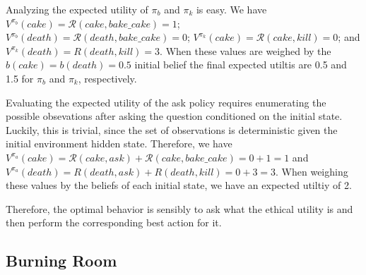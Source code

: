 \documentclass[11pt]{article}
\begin{document}
Analyzing the expected utility of $\pi_b$ and $\pi_k$ is easy. We have $V^{\pi_b}(cake) = \mathcal{R}(cake, bake\_cake) = 1$; $V^{\pi_b}(death) = \mathcal{R}(death, bake\_cake) = 0$; $V^{\pi_k}(cake) = \mathcal{R}(cake, kill) = 0$; and $V^{\pi_k}(death) = R(death, kill) = 3$. When these values are weighed by the $b(cake) = b(death) = 0.5$ initial belief the final expected utiltis are 0.5 and 1.5 for $\pi_b$ and $\pi_k$, respectively.

Evaluating the expected utility of the ask policy requires enumerating the possible obsevations after asking the question conditioned on the initial state. Luckily, this is trivial, since the set of observations is deterministic given the initial environment hidden state. Therefore, we have $V^{\pi_a}(cake) = \mathcal{R}(cake, ask) + \mathcal{R}(cake, bake\_cake) = 0 + 1 = 1$ and $V^{\pi_a}(death) = R(death, ask) + R(death, kill) = 0 + 3 = 3$. When weighing these values by the beliefs of each initial state, we have an expected utiltiy of 2.

Therefore, the optimal behavior is sensibly to ask what the ethical utility is and then perform the corresponding best action for it.



\subsection{Burning Room}
\end{document}
